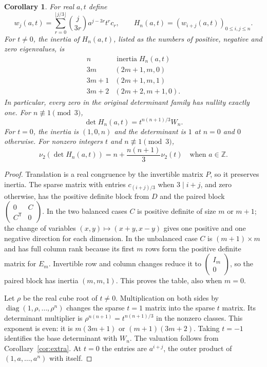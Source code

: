 \documentclass[11pt]{article}
\newtheorem{corollary}[theorem]{Corollary}
\newcommand{\ZZ}{\mathbb Z}
\begin{document}
\begin{corollary}\label{cor:inertia}
For real $a,t$ define
\[
 w_j(a,t)=\sum_{r=0}^{\lfloor j/3\rfloor}
  \binom j{3r}a^{j-3r}t^r c_r,\qquad
 H_n(a,t)=(w_{i+j}(a,t))_{0\leq i,j\leq n}.
\]
For $t\ne0$, the inertia of $H_n(a,t)$, listed as the numbers of positive,
negative and zero eigenvalues, is
\[
\begin{array}{c|c}
n&\operatorname{inertia} H_n(a,t)\\\hline
3m&(2m+1,m,0)\\
3m+1&(2m+1,m,1)\\
3m+2&(2m+2,m+1,0).
\end{array}
\]
In particular, every zero in the original determinant family has nullity
exactly one. For $n\not\equiv1\pmod3$,
\[
 \det H_n(a,t)=t^{n(n+1)/3}W_n.
\]
For $t=0$, the inertia is $(1,0,n)$ and the determinant is $1$ at $n=0$
and $0$ otherwise. For nonzero integers $t$ and $n\not\equiv1\pmod3$,
\[
 \nu_2(\det H_n(a,t))=n+\frac{n(n+1)}3\nu_2(t)
 \quad\text{when }a\in\ZZ.
\]
\end{corollary}
\begin{proof}
Translation is a real congruence by the invertible matrix $P$, so it
preserves inertia. The sparse matrix with entries $c_{(i+j)/3}$ when
$3\mid i+j$, and zero otherwise, has the positive definite block
from $D$ and the paired block
$\left(\begin{smallmatrix}0&C\\C^{\mathsf T}&0\end{smallmatrix}\right)$.
In the two balanced cases $C$ is positive definite of size $m$ or $m+1$;
the change of variables $(x,y)\mapsto(x+y,x-y)$ gives one positive and
one negative direction for each dimension. In the unbalanced case $C$
is $(m+1)\times m$ and has full column rank because its first $m$ rows
form the positive definite matrix for $E_m$. Invertible row and column
changes reduce it to $\left(\begin{smallmatrix}I_m\\0\end{smallmatrix}\right)$,
so the paired block has inertia $(m,m,1)$. This proves the table, also
when $m=0$.

Let $\rho$ be the real cube root of $t\ne0$. Multiplication on both sides
by $\operatorname{diag}(1,\rho,\ldots,\rho^n)$ changes the sparse
$t=1$ matrix into the sparse $t$ matrix. Its determinant multiplier is
$\rho^{n(n+1)}=t^{n(n+1)/3}$ in the nonzero classes. This exponent is
even: it is $m(3m+1)$ or $(m+1)(3m+2)$. Taking $t=-1$ identifies the
base determinant with $W_n$. The valuation follows from
Corollary~\ref{cor:extra}. At $t=0$ the entries are $a^{i+j}$, the
outer product of $(1,a,\ldots,a^n)$ with itself.
\end{proof}
\end{document}
